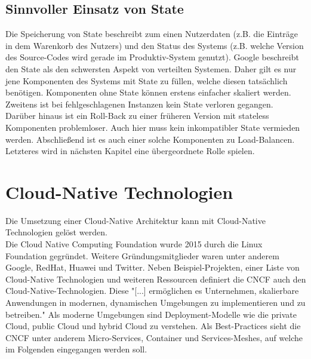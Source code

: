 \subsection{Sinnvoller Einsatz von State}
Die Speicherung von State beschreibt zum einen Nutzerdaten (z.B. die Einträge in dem Warenkorb des Nutzers) und den Status des Systems (z.B. welche Version des Source-Codes wird gerade im Produktiv-System genutzt). Google beschreibt den State als den schwersten Aspekt von verteilten Systemen. Daher gilt es nur jene Komponenten des Systems mit State zu füllen, welche diesen tatsächlich benötigen. Komponenten ohne State können erstens einfacher skaliert werden. Zweitens ist bei fehlgeschlagenen Instanzen kein State verloren gegangen. Darüber hinaus ist ein Roll-Back zu einer früheren Version mit stateless Komponenten problemloser. Auch hier muss kein inkompatibler State vermieden werden. Abschließend ist es auch einer solche Komponenten zu Load-Balancen. Letzteres wird in nächsten Kapitel eine übergeordnete Rolle spielen. 

\section{Cloud-Native Technologien}
Die Umsetzung einer Cloud-Native Architektur kann mit Cloud-Native Technologien gelöst werden.\\
Die Cloud Native Computing Foundation wurde 2015 durch die Linux Foundation gegründet. Weitere Gründungsmitglieder waren unter anderem Google, RedHat, Huawei und Twitter. Neben Beispiel-Projekten, einer Liste von Cloud-Native Technologien und weiteren Ressourcen definiert die CNCF auch den Cloud-Native-Technologien. Diese "[...] ermöglichen es Unternehmen, skalierbare Anwendungen in modernen, dynamischen Umgebungen zu implementieren und zu betreiben." Als moderne Umgebungen sind Deployment-Modelle wie die private Cloud, public Cloud und hybrid Cloud zu verstehen. Als Best-Practices sieht die CNCF unter anderem Micro-Services, Container und Services-Meshes, auf welche im Folgenden eingegangen werden soll.

